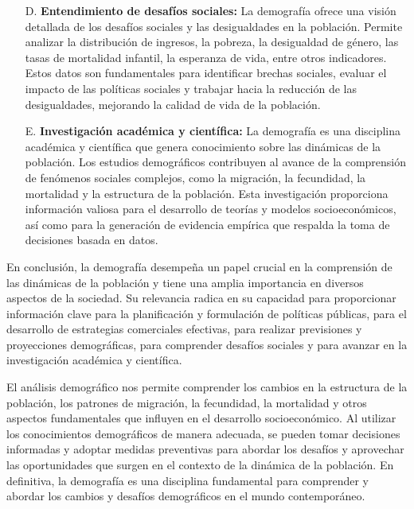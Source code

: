 \documentclass[8pt,a4paper]{beamer}
\begin{document}
{\begin{frame}{}
\begin{block}{}
\begin{enumerate}
\item[D.] \textbf{Entendimiento de desafíos sociales:} La demografía ofrece una visión detallada de los desafíos sociales y las desigualdades en la población. Permite analizar la distribución de ingresos, la pobreza, la desigualdad de género, las tasas de mortalidad infantil, la esperanza de vida, entre otros indicadores. Estos datos son fundamentales para identificar brechas sociales, evaluar el impacto de las políticas sociales y trabajar hacia la reducción de las desigualdades, mejorando la calidad de vida de la población.

\end{enumerate}
\end{block}
\end{frame}

\begin{frame}{}
\justifying
\begin{block}{}
\justifying
\begin{itemize}
\justifying
\item[E.] \textbf{Investigación académica y científica:} La demografía es una disciplina académica y científica que genera conocimiento sobre las dinámicas de la población. Los estudios demográficos contribuyen al avance de la comprensión de fenómenos sociales complejos, como la migración, la fecundidad, la mortalidad y la estructura de la población. Esta investigación proporciona información valiosa para el desarrollo de teorías y modelos socioeconómicos, así como para la generación de evidencia empírica que respalda la toma de decisiones basada en datos.
\end{itemize}
En conclusión, la demografía desempeña un papel crucial en la comprensión de las dinámicas de la población y tiene una amplia importancia en diversos aspectos de la sociedad. Su relevancia radica en su capacidad para proporcionar información clave para la planificación y formulación de políticas públicas, para el desarrollo de estrategias comerciales efectivas, para realizar previsiones y proyecciones demográficas, para comprender desafíos sociales y para avanzar en la investigación académica y científica. 
\end{block}

\end{frame}

\begin{frame}{}
\begin{block}{}
\justifying
El análisis demográfico nos permite comprender los cambios en la estructura de la población, los patrones de migración, la fecundidad, la mortalidad y otros aspectos fundamentales que influyen en el desarrollo socioeconómico. Al utilizar los conocimientos demográficos de manera adecuada, se pueden tomar decisiones informadas y adoptar medidas preventivas para abordar los desafíos y aprovechar las oportunidades que surgen en el contexto de la dinámica de la población. En definitiva, la demografía es una disciplina fundamental para comprender y abordar los cambios y desafíos demográficos en el mundo contemporáneo.


\end{block}
\end{frame}}
\end{document}
